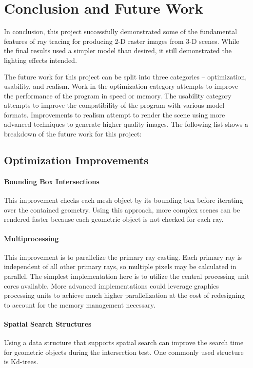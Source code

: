 \documentclass[letterpaper, 11pt, onecolumn, oneside]{article}
\begin{document}
\section{Conclusion and Future Work}
    In conclusion, this project successfully demonstrated some of the fundamental features of ray tracing for producing 2-D raster images from 3-D scenes.
    While the final results used a simpler model than desired, it still demonstrated the lighting effects intended.


    The future work for this project can be split into three categories -- optimization, usability, and realism.
    Work in the optimization category attempts to improve the performance of the program in speed or memory.
    The usability category attempts to improve the compatibility of the program with various model formats.
    Improvements to realism attempt to render the scene using more advanced techniques to generate higher quality images.
    The following list shows a breakdown of the future work for this project:
    \subsection{Optimization Improvements}
        \paragraph{Bounding Box Intersections}
        This improvement checks each mesh object by its bounding box before iterating over the contained geometry.
        Using this approach, more complex scenes can be rendered faster because each geometric object is not checked for each ray.

        \paragraph{Multiprocessing}
        This improvement is to parallelize the primary ray casting.
        Each primary ray is independent of all other primary rays, so multiple pixels may be calculated in parallel.
        The simplest implementation here is to utilize the central processing unit cores available.
        More advanced implementations could leverage graphics processing units to achieve much higher parallelization at the cost of redesigning to account for the memory management necessary.

        \paragraph{Spatial Search Structures}
        Using a data structure that supports spatial search can improve the search time for geometric objects during the intersection test.
        One commonly used structure is Kd-trees.
\end{document}

